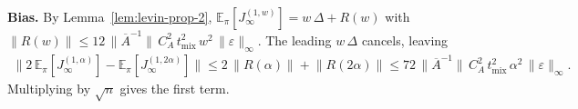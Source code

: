 \textbf{Bias.} By Lemma~\ref{lem:levin-prop-2},
\(\mathbb{E}_\pi [J_\infty^{(1, w)}] = w \, \Delta + R(w)\) with
\(\lVert  R(w)  \rVert \le 12 \, \lVert  \overline{A}^{-1}  \rVert \, C_A^2 \, t_{\text{mix}}^2 \, w^2 \, \lVert  \varepsilon  \rVert_\infty\).
The leading \(w \, \Delta\) cancels, leaving
\begin{equation}
\begin{aligned}
\lVert  2 \, \mathbb{E}_\pi [J_\infty^{(1, \alpha)}] - \mathbb{E}_\pi [J_\infty^{(1, 2 \alpha)}]  \rVert
  \le 2 \, \lVert  R(\alpha)  \rVert + \lVert  R(2 \alpha)  \rVert
  \le 72 \, \lVert  \overline{A}^{-1}  \rVert \, C_A^2 \, t_{\text{mix}}^2 \, \alpha^2 \, \lVert  \varepsilon  \rVert_\infty.
\end{aligned}
\end{equation}
Multiplying by \(\sqrt{n}\) gives the first term.

